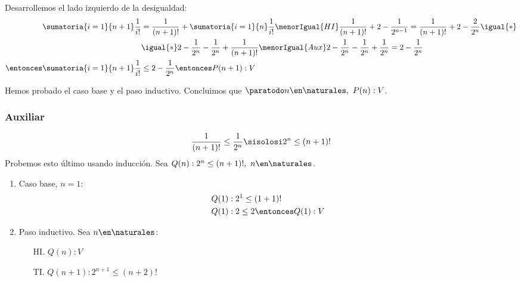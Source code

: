 \begin{enumerate}[label=\roman*)]
\begin{enumerate}[label=\arabic*)]
                Desarrollemos el lado izquierdo de la desigualdad:
                \begin{align*}
                  \sumatoria{i=1}{n+1} \frac{1}{i!}           & = \frac{1}{(n+1)!} + \sumatoria{i=1}{n} \frac{1}{i!} \menorIgual{HI}
                  \frac{1}{(n+1)!} + 2 - \frac{1}{2^{n-1}} = \frac{1}{(n+1)!} + 2 - \frac{2}{2^{n}} \igual{*}                                        \\
                                                              & \igual{*}  2 - \frac{1}{2^{n}} - \frac{1}{2^{n}} + \frac{1}{(n+1)!} \menorIgual{Aux}
                  2 - \frac{1}{2^{n}} - \frac{1}{2^{n}} + \frac{1}{2^{n}} = 2 - \frac{1}{2^{n}}                                                      \\
                  \entonces \sumatoria{i=1}{n+1} \frac{1}{i!} & \leq 2 - \frac{1}{2^{n}} \entonces P(n+1):V
                \end{align*}
        \end{enumerate}

        Hemos probado el caso base y el paso inductivo. Concluimos que $\paratodo n \en \naturales, \ P(n): V$.

        \subsubsection*{Auxiliar}
        \begin{align*}
          \frac{1}{(n+1)!} \leq \frac{1}{2^n} \sisolosi 2^n \leq (n+1)!
        \end{align*}
        Probemos esto último usando inducción. Sea $Q(n): 2^n \leq (n+1)!, \ n \en \naturales$.

        \begin{enumerate}[label=\arabic*)]
          \item Caso base, $n = 1$:
                \begin{align*}
                  Q(1) & : 2^1 \leq (1+1)!           \\
                  Q(1) & : 2 \leq 2 \entonces Q(1):V
                \end{align*}
          \item Paso inductivo. Sea $n \en \naturales$:
                \begin{enumerate}
                  \item[HI.] $Q(n): V$
                  \item[TI.] $Q(n+1): 2^{n+1} \leq (n+2)! $
                \end{enumerate}


\end{enumerate}
\end{enumerate}
